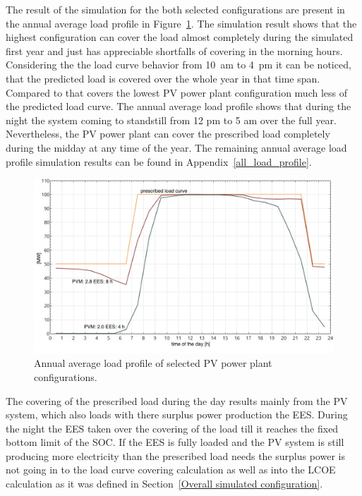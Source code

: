 The result of the simulation for the both selected configurations are present in the annual average load profile in Figure~\ref{PV_annual_profil}. The simulation result shows that the highest configuration can cover the load almost completely during the simulated first year and just has appreciable shortfalls of covering in the morning hours. Considering the the load curve behavior from \SI{10}{am} to \SI{4}{pm} it can be noticed, that the predicted load is covered over the whole year in that time span. Compared to that covers the lowest PV power plant configuration much less of the predicted load curve. The  annual average load profile shows that during the night the system coming to standstill from 12 pm to 5 am over the full year. Nevertheless, the PV power plant can cover the prescribed load completely during the midday at any time of the year. The remaining  annual average load profile simulation results can be found in Appendix~\ref{all_load_profile}.

\begin{figure}[htbp]  
\centering
\includegraphics[width=0.8\linewidth]{FIG/PV_annual_profil}
\caption[Annual average load profile of selected PV power plant configurations.]{Annual average load profile of selected PV power plant configurations.}\label{PV_annual_profil}
\end{figure}
The covering of the prescribed load during the day results mainly from the PV system, which also loads with there surplus power production the EES. During the night the EES taken over the covering of the load till it reaches the fixed bottom limit of the SOC. If the EES is fully loaded and the PV system is still producing more electricity than the prescribed load needs the surplus power is not going in to the load curve covering calculation as well as into the LCOE calculation as it was defined in Section~\ref{Overall simulated configuration}. 


